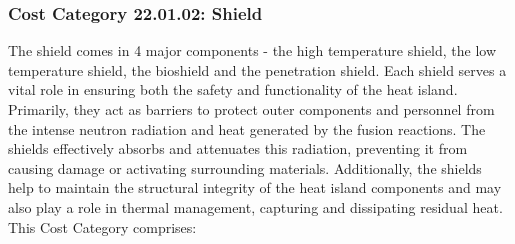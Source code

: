 
\subsubsection*{Cost Category 22.01.02: Shield}

The shield comes in 4 major components - the high temperature shield, the low temperature shield, the bioshield and the penetration shield. Each shield serves a vital role in ensuring both the safety and functionality of the heat island. Primarily, they act as barriers to protect outer components and personnel from the intense neutron radiation and heat generated by the fusion reactions. The shields effectively absorbs and attenuates this radiation, preventing it from causing damage or activating surrounding materials. Additionally, the shields help to maintain the structural integrity of the heat island components and may also play a role in thermal management, capturing and dissipating residual heat. \\

This Cost Category comprises: 


